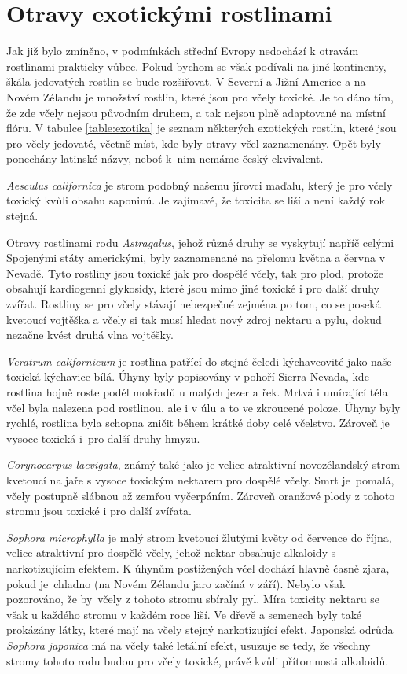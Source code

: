 \documentclass[openany, oneside, a4paper, 12pt, final]{memoir}
\begin{document}
\section{Otravy exotickými rostlinami}
Jak již bylo zmíněno, v podmínkách střední Evropy nedochází k otravám rostlinami prakticky vůbec. Pokud bychom se však podívali na jiné kontinenty, škála jedovatých rostlin se bude rozšiřovat. V Severní a Jižní Americe a na Novém Zélandu je množství rostlin, které jsou pro včely toxické. Je to dáno tím, že zde včely nejsou původním druhem, a tak nejsou plně adaptované na místní flóru. V tabulce \ref{table:exotika} je seznam některých exotických rostlin, které jsou pro včely jedovaté, včetně míst, kde byly otravy včel zaznamenány. Opět byly ponechány latinské názvy, neboť k~nim nemáme český ekvivalent. 

\textit{Aesculus californica} je strom podobný našemu jírovci maďalu, který je pro včely toxický kvůli obsahu saponinů. Je zajímavé, že toxicita se liší a není každý rok stejná. \cite{adler2000ecological}


Otravy rostlinami rodu \textit{Astragalus}, jehož různé druhy se vyskytují napříč celými Spojenými státy americkými, byly zaznamenané na přelomu května a června v Nevadě. Tyto rostliny jsou toxické jak pro dospělé včely, tak pro plod, protože obsahují kardiogenní glykosidy, které jsou mimo jiné toxické i pro další druhy zvířat. Rostliny se pro včely stávají nebezpečné zejména po tom, co se poseká kvetoucí vojtěška a včely si tak musí hledat nový zdroj nektaru a pylu, dokud nezačne kvést druhá vlna vojtěšky. \cite{vansell1934adult}

\textit{Veratrum californicum} je rostlina patřící do stejné čeledi kýchavcovité jako naše toxická kýchavice bílá. Úhyny byly popisovány v pohoří Sierra Nevada, kde rostlina hojně roste podél mokřadů u malých jezer a řek. Mrtvá i umírající těla včel byla nalezena pod rostlinou, ale i v úlu a to ve zkroucené poloze. Úhyny byly rychlé, rostlina byla schopna zničit během krátké doby celé včelstvo. Zároveň je vysoce toxická i~pro další druhy hmyzu. \cite{vansell1933plant}

\textit{Corynocarpus laevigata}, známý také jako  je velice atraktivní no\-vo\-zé\-land\-ský strom kvetoucí na jaře s vysoce toxickým nektarem pro dospělé včely. Smrt je~pomalá, včely postupně slábnou až zemřou vyčerpáním. Zároveň oranžové plody z tohoto stromu jsou toxické i pro další zvířata. \cite{palmer1962poisoning}

\textit{Sophora microphylla} je malý strom kvetoucí žlutými květy od července do října, velice atraktivní pro dospělé včely, jehož nektar obsahuje alkaloidy s narkotizujícím efektem. K úhynům postižených včel dochází hlavně časně zjara, pokud je~chladno (na Novém Zélandu jaro začíná v září). Nebylo však pozorováno, že by~včely z tohoto stromu sbíraly pyl. Míra toxicity nektaru se však u každého stromu v každém roce liší. Ve dřevě a semenech byly také prokázány látky, které mají na včely stejný narkotizující efekt. Japonská odrůda \textit{Sophora japonica} má na včely také letální efekt, usuzuje se tedy, že všechny stromy tohoto rodu budou pro včely toxické, právě kvůli přítomnosti alkaloidů. \cite{clinch1972effect}
\end{document}
